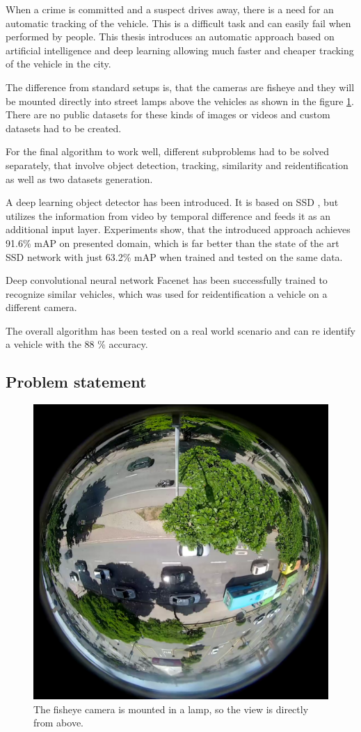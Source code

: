 \documentclass[a4paper,12pt,titlepage, twoside]{article}
\numberwithin{figure}{section}
\begin{document}
When a crime is committed and a suspect drives away, there is a need for an automatic tracking of the vehicle. This is a difficult task and can easily fail when performed by people. This thesis introduces an automatic approach based on artificial intelligence and deep learning allowing much faster and cheaper tracking of the vehicle in the city. 

The difference from standard setups is, that the cameras are fisheye and they will be mounted directly into street lamps above the vehicles as shown in the figure \ref{fig:stream3}. There are no public datasets for these kinds of images or videos and custom datasets had to be created.

For the final algorithm to work well, different subproblems had to be solved separately, that involve object detection, tracking, similarity and reidentification as well as two datasets generation.

A deep learning object detector has been introduced. It is based on SSD \cite{liu2016ssd}, but utilizes the information from video by temporal difference and feeds it as an additional input layer. Experiments show, that the introduced approach achieves 91.6\% mAP on presented domain, which is far better than the state of the art SSD network with just 63.2\% mAP when trained and tested on the same data.

Deep convolutional neural network Facenet \cite{schroff2015facenet} has been successfully trained to recognize similar vehicles, which was used for reidentification a vehicle on a different camera.

The overall algorithm has been tested on a real world scenario and can re identify a vehicle with the 88 \% accuracy.

\subsection{Problem statement}

\begin{figure}[h]
\centering
\includegraphics[width=0.7\linewidth]{fig/stream3.png}
\caption{The fisheye camera is mounted in a lamp, so the view is directly from above.}
\label{fig:stream3}
\end{figure}
\end{document}
